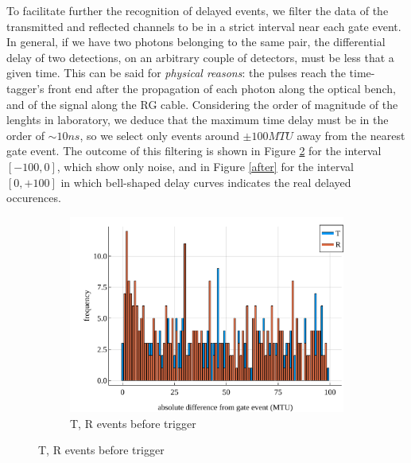\documentclass[10pt, final]{article}
\begin{document}
\begin{multicols}{2}
To facilitate further the recognition of delayed events, we filter the data of the transmitted and reflected channels to be in a strict interval near each gate event.
In general, if we have two photons belonging to the same pair, the differential delay of two detections, on an arbitrary couple of detectors, must be less that a given time. This can be said for \emph{physical reasons}: the pulses reach the time-tagger's front end after the propagation of each photon along the optical bench, and of the signal along the RG cable. Considering the order of magnitude of the lenghts in laboratory, we deduce that the maximum time delay must be in the order of $\sim 10 ns$, so we select only events around $\pm 100 MTU$ away from the nearest gate event. The outcome of this filtering is shown in Figure \ref{before} for the interval $[-100, 0]$, which show only noise, and in Figure \ref{after} for the interval $[0, +100]$ in which bell-shaped delay curves indicates the real delayed occurences.
\begin{mdframed}
    \begin{figure}[H]
        \begin{subfigure}{\textwidth}
            \centering
            \includegraphics[width = \textwidth]{../images/before.pdf}
            \caption{T, R events before trigger}
            \label{before}
        \end{subfigure}


\end{figure}
\end{mdframed}
\end{multicols}
\end{document}
